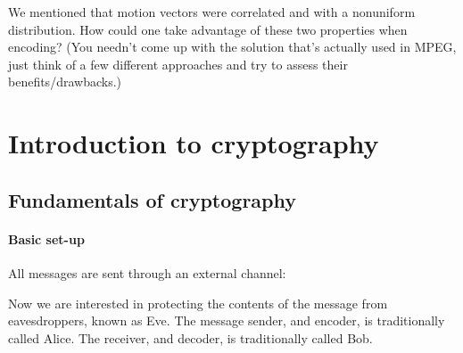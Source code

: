 \documentclass[a4paper, 11pt, openany]{book}
\begin{document}
\begin{exercise}
We mentioned that motion vectors were correlated and with a nonuniform distribution. How could one take advantage of these two properties when encoding? (You needn't come up with the solution that's actually used in MPEG, just think of a few different approaches and try to assess their benefits/drawbacks.)
\end{exercise}

\section{Introduction to cryptography}
\label{sec:11}


\subsection{Fundamentals of cryptography}

\paragraph{Basic set-up}

All messages are sent through an external channel:

\begin{center}
\end{center}

Now we are interested in protecting the contents of the message from eavesdroppers, known as Eve. The message sender, and encoder, is traditionally called Alice.
The receiver, and decoder, is traditionally called Bob.
\end{document}
